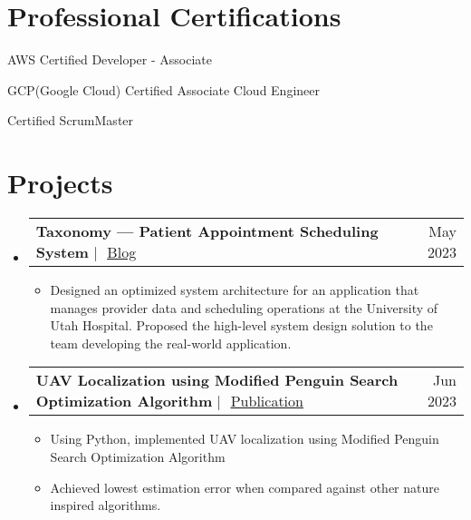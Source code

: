 \documentclass[letterpaper]{article}
\makeatletter
\newcommand{\resumeItem}[1]{
  \item\small{
    {#1 \vspace{-2pt}}
  }
}
\newcommand{\resumeProjectHeading}[2]{
    \item
    \begin{tabular*}{1\textwidth}{l@{\extracolsep{\fill}}r}
      \small#1 & #2 \\
    \end{tabular*}\vspace{-7pt}
}
\newcommand{\resumeSubHeadingListStart}{\begin{itemize}[leftmargin=0in, label={}]}
\newcommand{\resumeItemListStart}{\begin{itemize}}
\newcommand{\resumeItemListEnd}{\end{itemize}\vspace{-5pt}}
\makeatother
\begin{document}
\vspace{-5pt}
\section{Professional Certifications}
    \resumeItemListStart 
    \small{
        \resumeItem{AWS Certified Developer - Associate} \vspace{-3pt}
        \resumeItem{GCP(Google Cloud) Certified Associate Cloud Engineer}\vspace{-3pt}
        \resumeItem{Certified ScrumMaster}\vspace{-3pt}
        }
    \resumeItemListEnd

\section{Projects}
\resumeSubHeadingListStart
\resumeProjectHeading
      {\textbf{Taxonomy — Patient Appointment Scheduling System} $|$ 
      {\faIcon{link}}$ $
      \underline{\href{https://medium.com/@siddartha.muppalla/provider-taxonomy-patient-appointment-scheduler-a1538c10f7c0}{Blog}}\vspace{1pt}}{\small{May 2023}}
        \resumeItemListStart
            \resumeItem{Designed an optimized system architecture for an application that manages provider data and scheduling operations at the University of Utah Hospital. Proposed the high-level system design solution to the team developing the real-world application.}
            \resumeItemListEnd
            
            \vspace{5pt}
      \resumeProjectHeading
      {\textbf{UAV Localization using Modified Penguin Search Optimization Algorithm} $|$ 
      {\faIcon{link}}$ $
      \underline{\href{https://doi.org/10.1016/j.compeleceng.2023.108757}{Publication}}\vspace{1pt}}{\small{Jun 2023}}
        \resumeItemListStart
            \resumeItem{Using Python, implemented UAV localization using Modified Penguin Search Optimization Algorithm}
            \resumeItem{Achieved lowest estimation error when compared against other nature inspired algorithms.}
      \resumeItemListEnd
    \end{itemize}
    
      
\end{document}
